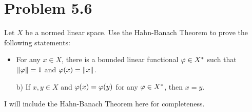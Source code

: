 \section{Problem 5.6}
Let $X$ be a normed linear space. Use the Hahn-Banach Theorem to prove the following statements:
\begin{itemize}[a)]
    \item For any $x \in X$, there is a bounded linear functional $\varphi \in X^{*}$ such that $\norm{\varphi} = 1$ and $\varphi (x) = \norm{x}$.
    \item[b)] If $x, y \in X$ and $\varphi(x) = \varphi(y) $ for any $\varphi \in X^{*}$, then $x = y$.
\end{itemize}
\partbreak
\begin{solution}

    I will include the Hahn-Banach Theorem here for completeness.
    

\end{solution}

